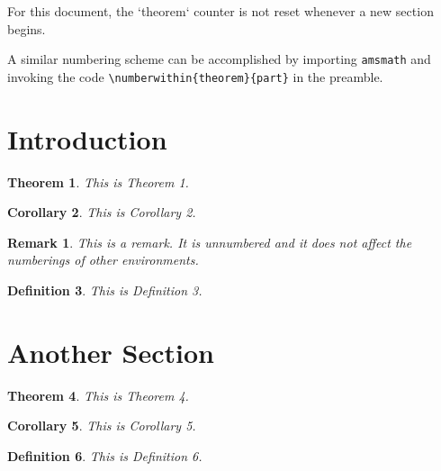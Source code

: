 \documentclass{article}
\newtheorem{theorem}{Theorem}
\newtheorem{corollary}[theorem]{Corollary}
\newtheorem{definition}[theorem]{Definition}
\newtheorem*{remark*}{Remark}
\begin{document}
For this document, the `theorem` counter is not reset whenever a new section begins.

A similar numbering scheme can be accomplished by importing \verb|amsmath| and invoking the code \verb|\numberwithin{theorem}{part}| in the preamble.

\section{Introduction}

\begin{theorem}
This is Theorem 1.
\end{theorem}

\begin{corollary}
This is Corollary 2.
\end{corollary}

\begin{remark*}
This is a remark. It is unnumbered and it does not affect the numberings of other environments.
\end{remark*}

\begin{definition}
This is Definition 3.
\end{definition}



\section{Another Section}

\begin{theorem}
This is Theorem 4.
\end{theorem}

\begin{corollary}
This is Corollary 5.
\end{corollary}

\begin{definition}
This is Definition 6.
\end{definition}
\end{document}
